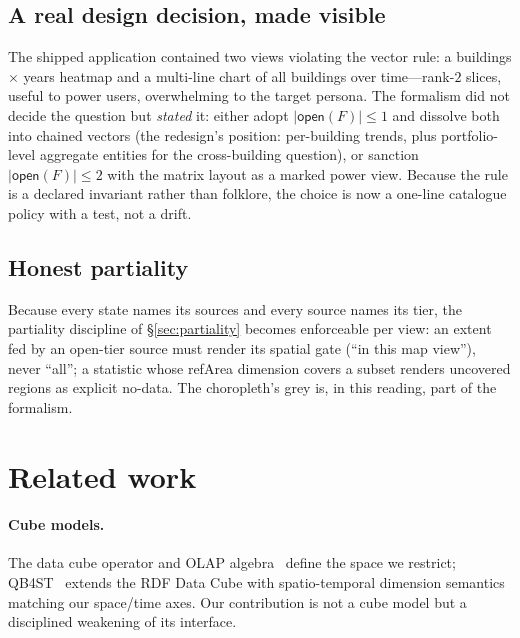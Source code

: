 \documentclass[11pt,a4paper]{article}
\theoremstyle{remark}
\newcommand{\open}{\mathsf{open}}
\begin{document}
\subsection{A real design decision, made visible}\label{sec:decision}

The shipped application contained two views violating the vector rule: a buildings
$\times$ years heatmap and a multi-line chart of all buildings over
time---rank-$2$ slices, useful to power users, overwhelming to the target persona.
The formalism did not decide the question but \emph{stated} it: either adopt
$|\open(F)| \le 1$ and dissolve both into chained vectors (the redesign's
position: per-building trends, plus portfolio-level aggregate entities for the
cross-building question), or sanction $|\open(F)| \le 2$ with the matrix layout as
a marked power view. Because the rule is a declared invariant rather than
folklore, the choice is now a one-line catalogue policy with a test, not a drift.

\subsection{Honest partiality}

Because every state names its sources and every source names its tier, the
partiality discipline of \S\ref{sec:partiality} becomes enforceable per view: an
extent fed by an open-tier source must render its spatial gate (``in this map
view''), never ``all''; a statistic whose refArea dimension covers a subset
renders uncovered regions as explicit no-data. The choropleth's grey is, in this
reading, part of the formalism.

\section{Related work}\label{sec:related}

\paragraph{Cube models.} The data cube operator and OLAP algebra~\cite{gray1997,
codd1993} define the space we restrict; QB4ST~\cite{qb4st} extends the RDF Data
Cube with spatio-temporal dimension semantics matching our space/time axes. Our
contribution is not a cube model but a disciplined weakening of its interface.
\end{document}
